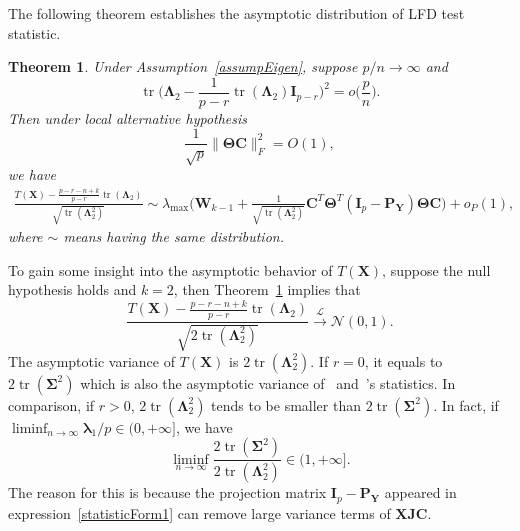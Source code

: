 \documentclass[12pt]{article} %
\DeclareMathOperator{\mytr}{tr}
\newcommand{\bX}{\mathbf{X}}
\newcommand{\bP}{\mathbf{P}}
\newcommand{\bY}{\mathbf{Y}}
\newcommand{\bJ}{\mathbf{J}}
\newcommand{\bC}{\mathbf{C}}
\newcommand{\bI}{\mathbf{I}}
\newcommand{\bW}{\mathbf{W}}
\newcommand{\bfsym}[1]{\ensuremath{\boldsymbol{#1}}}
\def\blambda {\bfsym {\lambda}}
\def\bLambda {\bfsym {\Lambda}}
\def\bSigma {\bfsym {\Sigma}}
\def\bTheta {\bfsym {\Theta}}
\newtheorem{theorem}{Theorem}
\theoremstyle{definition}
\begin{document}
The following theorem establishes the asymptotic distribution of LFD test statistic.
\begin{theorem}\label{thm1}
    Under Assumption~\ref{assumpEigen}, suppose $p/n\to \infty$ and
    $$
    \mytr\Big(\bLambda_2-\frac{1}{p-r}\mytr (\bLambda_2)\bI_{p-r}\Big)^2=o\big(\frac{p}{n}\big).
    $$
    Then under local alternative hypothesis
    \begin{equation*}
        \frac{1}{\sqrt{p}}\|\bTheta \bC\|_F^2=O(1),
    \end{equation*}
    we have
    $$
    \begin{aligned}
        \frac{T(\bX)-\frac{p-r-n+k}{p-r}\mytr(\bLambda_2)}{\sqrt{\mytr (\bLambda_2^2)}}
        \sim
        \lambda_{\max}\Big(\bW_{k-1}+\tfrac{1}{\sqrt{\mytr(\bLambda_2^2)}} \bC^T \bTheta^T (\bI_p-\bP_{\bY})\bTheta \bC\Big)
        +o_P(1),
    \end{aligned}
    $$
    where $\sim$ means having the same distribution.
\end{theorem}
To gain some insight into the asymptotic behavior of $T(\bX)$, suppose the null hypothesis holds and $k=2$, then Theorem~\ref{thm1} implies that
$$
\frac{T(\bX)-\frac{p-r-n+k}{p-r}\mytr(\bLambda_2)}{\sqrt{2\mytr (\bLambda_2^2)}}\xrightarrow{\mathcal{L}}\mathcal{N}(0,1).
$$
The asymptotic variance of $T(\bX)$ is ${2\mytr (\bLambda_2^2)}$.
If $r=0$, it equals to ${2\mytr (\bSigma^2)}$ which is also the asymptotic variance of~\citet{Bai1996Efiect} and~\citet{Chen2010A}'s statistics.
In comparison, if $r>0$, ${2\mytr (\bLambda_2^2)}$ tends to be smaller than $2\mytr(\bSigma^2)$.
In fact, if $\liminf_{n\to \infty} \blambda_1/p \in (0,+\infty]$, we have
$$
\liminf_{n\to \infty}\frac{2\mytr(\bSigma^2)}{2\mytr(\bLambda_2^2)}\in (1,+\infty].
$$
The reason for this is because the projection matrix $\bI_p-\bP_{\bY}$ appeared in expression~\eqref{statisticForm1} can remove large variance terms of $\bX\bJ \bC$.
\end{document}
